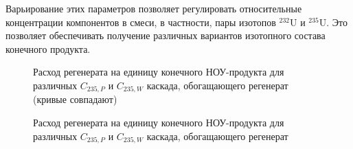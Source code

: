 Варьирование этих параметров позволяет регулировать относительные концентрации компонентов в смеси, в частности, пары изотопов $^{232}$U и $^{235}$U. Это позволяет обеспечивать получение различных вариантов изотопного состава конечного продукта. 

\begin{figure}[ht]
  \caption{Расход регенерата на единицу конечного НОУ-продукта для различных  $C_{235, P}$ и $C_{235, W}$ каскада, обогащающего регенерат (кривые совпадают)}\label{Figure_10}
\end{figure}

\begin{figure}[ht]
  \caption{Расход регенерата на единицу конечного НОУ-продукта для различных $C_{235, P}$ и $C_{235, W}$ каскада, обогащающего регенерат}\label{Figure_10_1}
\end{figure}

